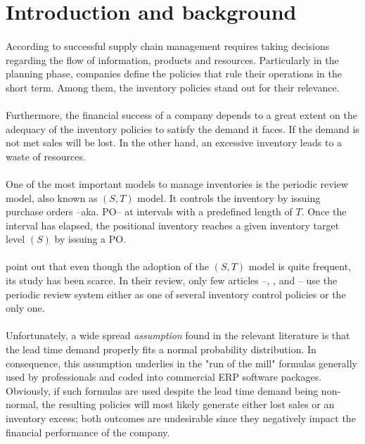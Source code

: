 \documentclass[letterpaper]{article}
\begin{document}
\section*{Introduction and background}
\paragraph{}
According to \citet*{chopra2007supply} successful supply chain management requires taking decisions regarding the flow of information, products and resources. Particularly in the planning phase, companies define the policies that rule their operations in the short term. Among them, the inventory policies stand out for their relevance.

\paragraph{}
Furthermore, the financial success of a company depends to a great extent on the adequacy of the inventory policies to satisfy the demand it faces. If the demand is not met sales will be lost. In the other hand, an excessive inventory leads to a waste of resources.

\paragraph{}
One of the most important models to manage inventories is the periodic review model, also known as $(S,T)$ model. It controls the inventory by issuing purchase orders --aka. PO-- at intervals with a predefined length of $T$. Once the interval has elapsed, the positional inventory reaches a given inventory target level $(S)$ by issuing a PO.

\paragraph{}
\citet*{waller2008review} point out that even though the adoption of the $(S,T)$ model is quite frequent, its study has been scarce. In their review, only few articles --\citet*{blumenfeld1984trade}, \citet*{hsu1991integrating}, \citet*{ballou2005expressing} and \citet*{sezen2006changes}-- use the periodic review system either as one of several inventory control policies or the only one. 

\paragraph{}
Unfortunately, a wide spread \textit{assumption} found in the relevant literature is that the lead time demand properly fits a normal probability distribution. In consequence, this assumption underlies in the "run of the mill" formulas generally used by professionals and coded into commercial ERP software packages. Obviously, if such formulas are used despite the lead time demand being non-normal, the resulting policies will most likely generate either lost sales or an inventory excess; both outcomes are undesirable since they negatively impact the financial performance of the company.
\end{document}
